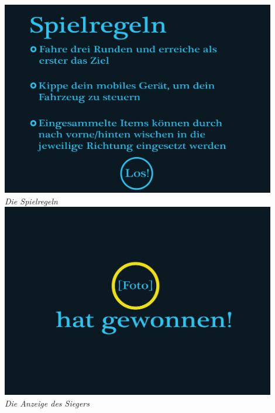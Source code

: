 \begin{flushright}
\newpage

\includegraphics[width=0.9\textwidth]{img/spielregeln.png}\\
\textit{Die Spielregeln}\\[2em]

\includegraphics[width=0.9\textwidth]{img/win.png}\\
\textit{Die Anzeige des Siegers}

\end{flushright}
